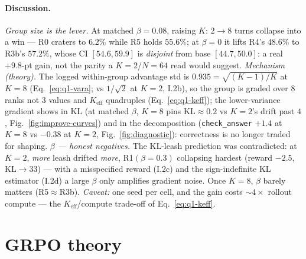 \documentclass[11pt,a4paper]{article}
\begin{document}
\paragraph{Discussion.}
\emph{Group size is the lever.} At matched $\beta{=}0.08$, raising $K{:}\,2{\to}8$ turns
collapse into a win --- R0 craters to $6.2\%$ while R5 holds $55.6\%$; at $\beta{=}0$ it lifts
R4's $48.6\%$ to R3b's $\mathbf{57.2\%}$, whose CI $[54.6,59.9]$ is \emph{disjoint} from base
$[44.7,50.0]$: a real $+9.8$-pt gain, not the parity a $K{=}2$/$N{=}64$ read would suggest.
\emph{Mechanism (theory).} The logged within-group advantage std is $0.935{=}\sqrt{(K{-}1)/K}$
at $K{=}8$ (Eq.~\eqref{eq:q1-vara}; vs $1/\sqrt2$ at $K{=}2$, I.2b), so the group is graded over
$8$ ranks not $3$ values and $K_{\mathrm{eff}}$ quadruples (Eq.~\eqref{eq:q1-keff}); the
lower-variance gradient shows in KL (at matched $\beta$, $K{=}8$ pins $\mathrm{KL}{\approx}0.2$
vs $K{=}2$'s drift past $4$, Fig.~\ref{fig:improve-curves}) and in the decomposition
(\texttt{check\_answer} $+1.4$ at $K{=}8$ vs $-0.38$ at $K{=}2$, Fig.~\ref{fig:diagnostic}):
correctness is no longer traded for shaping. \emph{$\beta$ --- honest negatives.} The KL-leash
prediction was contradicted: at $K{=}2$, \emph{more} leash drifted \emph{more}, R1$(\beta{=}0.3)$
collapsing hardest (reward $-2.5$, KL${\to}33$) --- with a misspecified reward (I.2c) and the
sign-indefinite KL estimator (I.2d) a large $\beta$ only amplifies gradient noise. Once $K{=}8$,
$\beta$ barely matters (R5${\approx}$R3b). \emph{Caveat:} one seed per cell, and the gain costs
${\sim}4{\times}$ rollout compute --- the $K_{\mathrm{eff}}$/compute trade-off of
Eq.~\eqref{eq:q1-keff}.

\clearpage
\section{GRPO theory}
\label{sec:theory}

\end{document}
